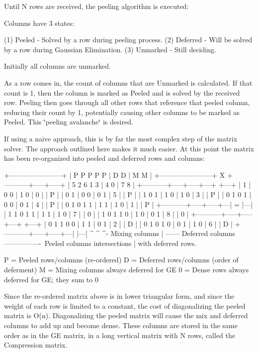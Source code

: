 Until N rows are received, the peeling algorithm is executed\+:

Columns have 3 states\+:

(1) Peeled -\/ Solved by a row during peeling process. (2) Deferred -\/ Will be solved by a row during Gaussian Elimination. (3) Unmarked -\/ Still deciding.

Initially all columns are unmarked.

As a row comes in, the count of columns that are Unmarked is calculated. If that count is 1, then the column is marked as Peeled and is solved by the received row. Peeling then goes through all other rows that reference that peeled column, reducing their count by 1, potentially causing other columns to be marked as Peeled. This \char`\"{}peeling avalanche\char`\"{} is desired.

If using a naive approach, this is by far the most complex step of the matrix solver. The approach outlined here makes it much easier. At this point the matrix has been re-\/organized into peeled and deferred rows and columns\+: \begin{DoxyVerb}+-----------------------+
| P P P P P | D D | M M |
+-----------------------+
            X
+-----------+-----+-----+
| 5 2 6 1 3 | 4 0 | 7 8 |
+-----------+-----+-----+---+   +---+
| 1         | 0 0 | 1 0 | 0 |   | P |
| 0 1       | 0 0 | 0 1 | 5 |   | P |
| 1 0 1     | 1 0 | 1 0 | 3 |   | P |
| 0 1 0 1   | 0 0 | 0 1 | 4 |   | P |
| 0 1 0 1 1 | 1 1 | 1 0 | 1 |   | P |
+-----------+-----+-----+---| = |---|
| 1 1 0 1 1 | 1 1 | 1 0 | 7 |   | 0 |
| 1 0 1 1 0 | 1 0 | 0 1 | 8 |   | 0 |
+-----------+-----+-----+---+   +---+
| 0 1 1 0 0 | 1 1 | 0 1 | 2 |   | D |
| 0 1 0 1 0 | 0 1 | 1 0 | 6 |   | D |
+-----------+-----+-----+---|   |---|
      ^          ^     ^- Mixing columns
      |          \------- Deferred columns
      \-----------------\ Peeled columns intersections
                        | with deferred rows.
\end{DoxyVerb}


P = Peeled rows/columns (re-\/ordered) D = Deferred rows/columns (order of deferment) M = Mixing columns always deferred for GE 0 = Dense rows always deferred for GE; they sum to 0

Since the re-\/ordered matrix above is in lower triangular form, and since the weight of each row is limited to a constant, the cost of diagonalizing the peeled matrix is O(n). Diagonalizing the peeled matrix will cause the mix and deferred columns to add up and become dense. These columns are stored in the same order as in the GE matrix, in a long vertical matrix with N rows, called the Compression matrix.

